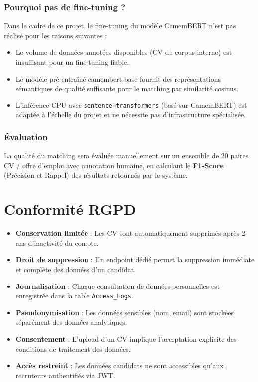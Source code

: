 \documentclass[12pt,a4paper]{report}
\begin{document}
\subsection{Pourquoi pas de fine-tuning ?}

Dans le cadre de ce projet, le fine-tuning du modèle CamemBERT n'est pas réalisé pour les raisons suivantes :

\begin{itemize}
    \item Le volume de données annotées disponibles (CV du corpus interne) est insuffisant pour un fine-tuning fiable.
    \item Le modèle pré-entraîné camembert-base fournit des représentations sémantiques de qualité suffisante pour le matching par similarité cosinus.
    \item L'inférence CPU avec \texttt{sentence-transformers} (basé sur CamemBERT) est adaptée à l'échelle du projet et ne nécessite pas d'infrastructure spécialisée.
\end{itemize}

\subsection{Évaluation}

La qualité du matching sera évaluée manuellement sur un ensemble de 20 paires CV / offre d'emploi avec annotation humaine, en calculant le \textbf{F1-Score} (Précision et Rappel) des résultats retournés par le système.

\chapter{Conformité RGPD}
\begin{itemize}
    \item \textbf{Conservation limitée} : Les CV sont automatiquement supprimés après 2 ans d'inactivité du compte.
    \item \textbf{Droit de suppression} : Un endpoint dédié permet la suppression immédiate et complète des données d'un candidat.
    \item \textbf{Journalisation} : Chaque consultation de données personnelles est enregistrée dans la table \texttt{Access\_Logs}.
    \item \textbf{Pseudonymisation} : Les données sensibles (nom, email) sont stockées séparément des données analytiques.
    \item \textbf{Consentement} : L'upload d'un CV implique l'acceptation explicite des conditions de traitement des données.
    \item \textbf{Accès restreint} : Les données candidats ne sont accessibles qu'aux recruteurs authentifiés via JWT.
\end{itemize}
\end{document}
